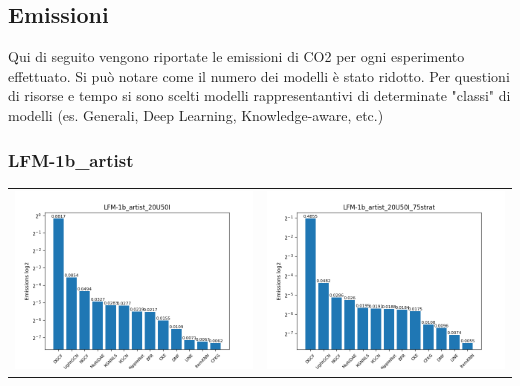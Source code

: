 \subsection{Emissioni}

Qui di seguito vengono riportate le emissioni di CO2 per ogni esperimento effettuato.
Si può notare come il numero dei modelli è stato ridotto. Per questioni di risorse e tempo si sono scelti modelli rappresentantivi di determinate "classi" di modelli (es. Generali, Deep Learning, Knowledge-aware, etc.) 


\subsubsection{LFM-1b\_artist}
\begin{table}[H]
    \centering
    \footnotesize
    \setlength\tabcolsep{0pt}
    \begin{tabularx}{\textwidth}{|X|X|}
        \hline
        \includegraphics[width=\linewidth, trim=0 0 0 0]{images/emissions_LFM-1b_artist_20U50I.png} &
        \includegraphics[width=\linewidth, trim=0 0 0 0]{images/emissions_LFM-1b_artist_20U50I_75strat.png} \\

\end{tabularx}
\end{table}
